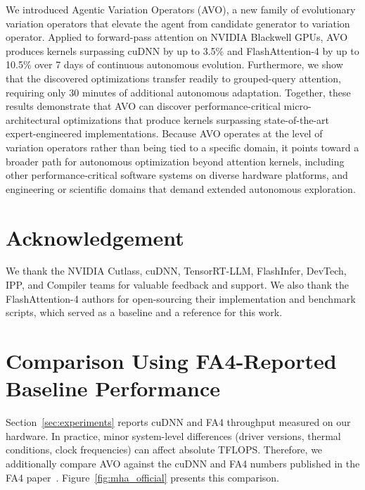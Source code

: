 \documentclass{article}
\begin{document}
We introduced Agentic Variation Operators (AVO), a new family of evolutionary variation operators that elevate the agent from candidate generator to variation operator.
Applied to forward-pass attention on NVIDIA Blackwell GPUs, AVO produces kernels surpassing cuDNN by up to 3.5\% and FlashAttention-4 by up to 10.5\% over 7 days of continuous autonomous evolution.
Furthermore, we show that the discovered optimizations transfer readily to grouped-query attention, requiring only 30 minutes of additional autonomous adaptation.
Together, these results demonstrate that AVO can discover performance-critical micro-architectural optimizations that produce kernels surpassing state-of-the-art expert-engineered implementations.
Because AVO operates at the level of variation operators rather than being tied to a specific domain,  it points toward a broader path for autonomous optimization beyond attention kernels, including other performance-critical software systems on diverse hardware platforms, and engineering or scientific domains that demand extended autonomous exploration.

\section*{Acknowledgement}
We thank the NVIDIA Cutlass, cuDNN, TensorRT-LLM, FlashInfer, DevTech, IPP, and Compiler teams for valuable feedback and support.
We also thank the FlashAttention-4 authors for open-sourcing their implementation and benchmark scripts, which served as a baseline and a reference for this work.





\appendix

\section{Comparison Using FA4-Reported Baseline Performance}
\label{app:fa4_baselines}

Section~\ref{sec:experiments} reports cuDNN and FA4 throughput measured on our hardware. In practice, minor system-level differences (driver versions, thermal conditions, clock frequencies) can affect absolute TFLOPS. Therefore, we additionally compare AVO against the cuDNN and FA4 numbers published in the FA4 paper~\citep{zadouri2026flashattention4}. Figure~\ref{fig:mha_official} presents this comparison.
\end{document}
